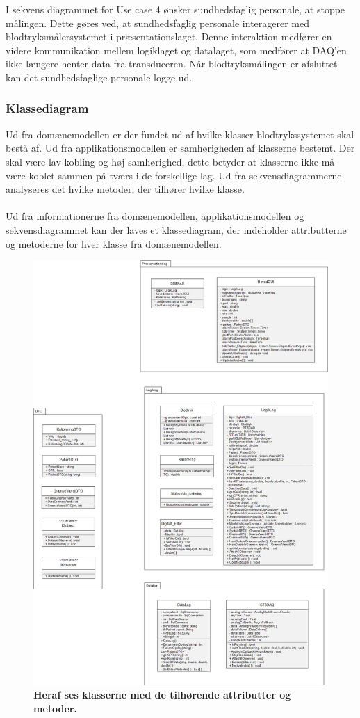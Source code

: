 I sekvens diagrammet for Use case 4 ønsker sundhedsfaglig personale, at stoppe målingen. Dette gøres ved, at sundhedsfaglig personale interagerer med blodtryksmålersystemet i præsentationslaget. Denne interaktion medfører en videre kommunikation mellem logiklaget og datalaget, som medfører at DAQ'en ikke længere henter data fra transduceren. Når blodtryksmålingen er afsluttet kan det sundhedsfaglige personale logge ud. 
\subsubsection{Klassediagram}
Ud fra domænemodellen er der fundet ud af hvilke klasser blodtrykssystemet skal bestå af. Ud fra applikationsmodellen er samhørigheden af klasserne bestemt. Der skal være lav kobling og høj samhørighed, dette betyder at klasserne ikke må være koblet sammen på tværs i de forskellige lag. Ud fra sekvensdiagrammerne analyseres det hvilke metoder, der tilhører hvilke klasse.\\\\
Ud fra informationerne fra domænemodellen, applikationsmodellen og sekvensdiagrammet kan der laves et klassediagram, der indeholder attributterne og metoderne for hver klasse fra domænemodellen.
\begin{figure}[H]
\includegraphics[width =1.0\textwidth , center]{billeder/klassediagram1}
\caption{\textbf{Heraf ses klasserne med de tilhørende attributter og metoder.}}
\end{figure}
